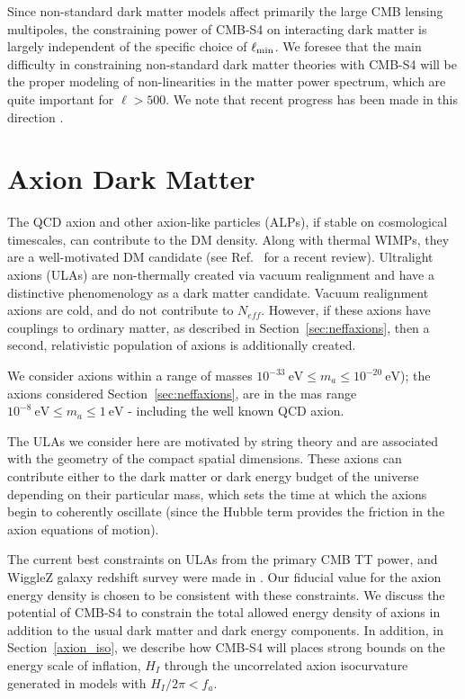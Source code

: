 Since non-standard dark matter models affect primarily the large CMB lensing multipoles, the constraining power of CMB-S4 on interacting dark matter is largely independent of the specific choice of $\ell_{\rm min}$. We foresee that the main difficulty in constraining non-standard dark matter theories with CMB-S4 will be the proper modeling of non-linearities in the matter power spectrum, which are quite important for $\ell > 500$. We note that recent progress has been made in this direction \cite{Vogelsberger:2015gpr}.


\section{Axion Dark Matter}
The QCD axion and other axion-like particles (ALPs), if stable on cosmological timescales, can contribute to the DM density. Along with thermal WIMPs, they are a well-motivated DM candidate (see Ref.~\cite{Marsh:2015xka} for a recent review). Ultralight axions (ULAs) are non-thermally created via vacuum realignment and have a distinctive phenomenology as a dark matter candidate. 
Vacuum realignment axions are cold, and do not contribute to $N_{eff}$. However, if these axions have couplings to ordinary matter, as described in Section~\ref{sec:neffaxions}, then a second, relativistic population of axions is additionally created.

We consider axions within a range of masses $10^{-33}~\mathrm{eV}\leq m_{a}\leq 10^{-20}~\mathrm{eV}$); the axions considered Section~\ref{sec:neffaxions}, are in the mas range $10^{-8}~\mathrm{eV}\leq m_{a}\leq 1~\mathrm{eV}$ - including the well known QCD axion.

The ULAs we consider here are motivated by string theory and are associated with the geometry of the compact spatial dimensions. These axions can contribute either to the dark matter or dark energy budget of the universe depending on their particular mass, which sets the time at which the axions begin to coherently oscillate (since the Hubble term provides the friction in the axion equations of motion).

The current best constraints on ULAs from the primary CMB TT power, and WiggleZ galaxy redshift survey were made in \cite{Hlozek:2014lca}. Our fiducial value for the axion energy density is chosen to be consistent with these constraints. We discuss the potential of CMB-S4 to constrain the total allowed energy density of axions in addition to the usual dark matter and dark energy components. In addition, in Section~\ref{axion_iso}, we describe how CMB-S4 will places strong bounds on the energy scale of inflation, $H_I$ through the uncorrelated axion isocurvature generated in models with $H_I/2\pi<f_a.$

